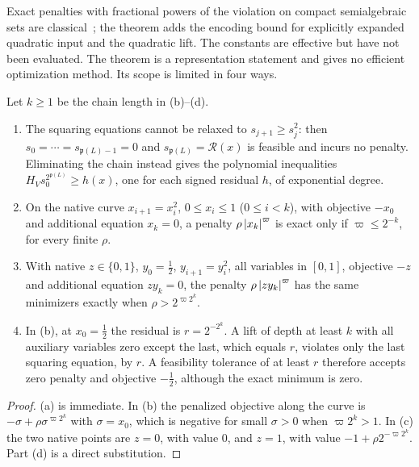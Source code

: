Exact penalties with fractional powers of the violation on compact
semialgebraic sets are classical~\cite{JiaoPhamTuyen2025}; the theorem adds
the encoding bound for explicitly expanded quadratic input and the quadratic
lift. The constants are effective but have not been evaluated. The theorem is
a representation statement and gives no efficient optimization method. Its
scope is limited in four ways.

\begin{proposition}
\label{prop:bnd-penalty-limits}
Let $k\ge1$ be the chain length in (b)--(d).
\begin{enumerate}[label=(\alph*),leftmargin=*]
\item The squaring equations cannot be relaxed to $s_{j+1}\ge s_j^2$: then
$s_0=\cdots=s_{\mathfrak p(L)-1}=0$ and $s_{\mathfrak p(L)}=\mathcal R(x)$ is
feasible and incurs no penalty. Eliminating the chain instead gives the
polynomial inequalities $H_Vs_0^{2^{\mathfrak p(L)}}\ge h(x)$, one for each
signed residual $h$, of exponential degree.
\item On the native curve $x_{i+1}=x_i^2$, $0\le x_i\le1$ ($0\le i<k$), with
objective $-x_0$ and additional equation $x_k=0$, a penalty
$\rho\left\lvert x_k\right\rvert^{\varpi}$ is exact only if $\varpi\le2^{-k}$, for every
finite $\rho$.
\item With native $z\in\{0,1\}$, $y_0=\tfrac12$, $y_{i+1}=y_i^2$, all
variables in $[0,1]$, objective $-z$ and additional equation $zy_k=0$, the
penalty $\rho\left\lvert zy_k\right\rvert^{\varpi}$ has the same minimizers exactly when
$\rho>2^{\varpi2^k}$.
\item In (b), at $x_0=\tfrac12$ the residual is $r=2^{-2^k}$. A lift of depth
at least $k$ with all auxiliary variables zero except the last, which equals
$r$, violates only the last squaring equation, by $r$. A feasibility tolerance
of at least $r$ therefore accepts zero penalty and objective $-\tfrac12$,
although the exact minimum is zero.
\end{enumerate}
\end{proposition}

\begin{proof}
(a) is immediate. In (b) the penalized objective along the curve is
$-\sigma+\rho\sigma^{\varpi2^k}$ with $\sigma=x_0$, which is negative for
small $\sigma>0$ when $\varpi2^k>1$. In (c) the two native points are
$z=0$, with value $0$, and $z=1$, with value $-1+\rho2^{-\varpi2^k}$. Part (d)
is a direct substitution.
\end{proof}

